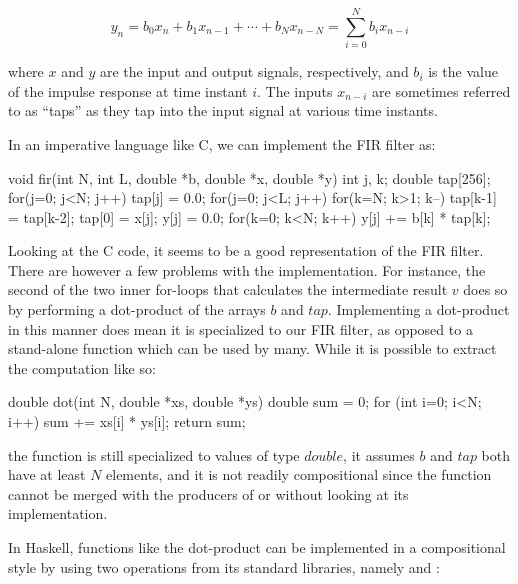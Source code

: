 \documentclass[../main.tex]{subfiles}
\begin{document}

\vspace{-2mm}
\begin{equation}
y_{n} = b_{0} x_{n} + b_{1} x_{n-1} + \cdots + b_{N} x_{n-N} = \sum_{i=0}^{N} b_{i} x_{n-i}
\end{equation}
\vspace{1mm}

\noindent where $x$ and $y$ are the input and output signals, respectively, and $b_i$ is the value of the impulse response at time instant $i$. The inputs $x_{n-i}$ are sometimes referred to as ``taps'' as they tap into the input signal at various time instants. 

In an imperative language like C, we can implement the FIR filter as:

\begin{code}
void fir(int N, int L, double *b, double *x, double *y)
{
 int j, k;
 double tap[256];
 for(j=0; j<N; j++) tap[j] = 0.0;
 for(j=0; j<L; j++)
 {
  for(k=N; k>1; k--) tap[k-1] = tap[k-2];
  tap[0] = x[j];
  y[j] = 0.0;
  for(k=0; k<N; k++) y[j] += b[k] * tap[k];
 }
}
\end{code}

\noindent Looking at the C code, it seems to be a good representation of the FIR filter. There are however a few problems with the implementation. For instance, the second of the two inner for-loops that calculates the intermediate result $v$ does so by performing a dot-product of the arrays $b$ and $tap$. Implementing a dot-product in this manner does mean it is specialized to our FIR filter, as opposed to a stand-alone function which can be used by many. While it is possible to extract the computation like so:

\begin{code}
double dot(int N, double *xs, double *ys)
{
  double sum = 0;
  for (int i=0; i<N; i++) sum += xs[i] * ys[i];
  return sum;
}
\end{code}

\noindent the function is still specialized to values of type $double$, it assumes $b$ and $tap$ both have at least $N$ elements, and it is not readily compositional since the function cannot be merged with the producers of  or  without looking at its implementation.

In Haskell, functions like the dot-product can be implemented in a compositional style by using two operations from its standard libraries, namely  and :
\end{document}

